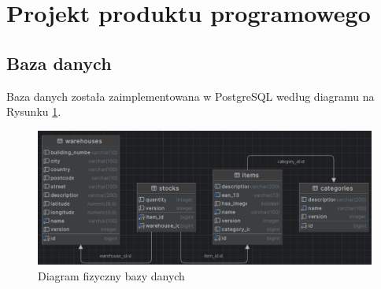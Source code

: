 \documentclass[../main.tex]{subfiles}
\begin{document}
\section{Projekt produktu programowego}
    \subsection{Baza danych}
        Baza danych została zaimplementowana w PostgreSQL według diagramu na Rysunku \ref{fig:db-diagram}.

        \begin{figure}[!ht]
            \centering
            \includegraphics[width=1.0\linewidth]{images/db-diagram.png}
            \caption{Diagram fizyczny bazy danych}
            \label{fig:db-diagram}
        \end{figure}
\end{document}
